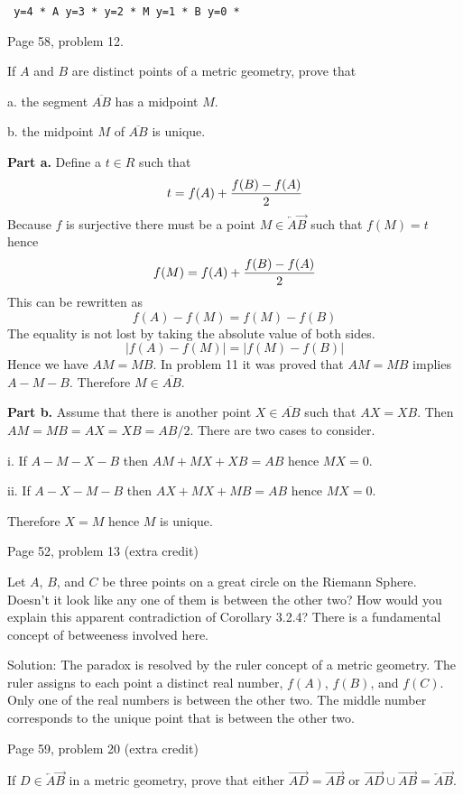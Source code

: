 {\obeylines\tt
y=4 * A
y=3 *
y=2 * M
y=1 * B
y=0 *
}

\beginsection Page 58, problem 12.

If $A$ and $B$ are distinct points of a metric geometry, prove that
\item{a.} the segment $\overline{AB}$ has a midpoint $M$.
\item{b.} the midpoint $M$ of $\overline{AB}$ is unique.

\medskip\noindent
{\bf Part a.}
Define a $t\in R$ such that
$$t=f(A)+{f(B)-f(A)\over 2}$$
Because $f$ is surjective there must be a point $M\in\overleftarrow A\overrightarrow B$
such that $f(M)=t$ hence
$$f(M)=f(A)+{f(B)-f(A)\over 2}$$
This can be rewritten as
$$f(A)-f(M)=f(M)-f(B)$$
The equality is not lost by taking the absolute value of both sides.
$$|f(A)-f(M)|=|f(M)-f(B)|$$
Hence we have $AM=MB$.
In problem 11 it was proved that $AM=MB$ implies $A{-}M{-}B$.
Therefore $M\in\overline{AB}$.

\medskip\noindent
{\bf Part b.}
Assume that there is another point $X\in\overline{AB}$ such that $AX=XB$.
Then $AM=MB=AX=XB=AB/2$.
There are two cases to consider.
\item{i.} If $A{-}M{-}X{-}B$ then $AM+MX+XB=AB$ hence $MX=0$.
\item{ii.} If $A{-}X{-}M{-}B$ then $AX+MX+MB=AB$ hence $MX=0$.
\par\noindent
Therefore $X=M$ hence $M$ is unique.

\beginsection Page 52, problem 13 (extra credit)

Let $A$, $B$, and $C$ be three points on a great circle on the Riemann Sphere.
Doesn't it look like any one of them is between the other two?
How would you explain this apparent contradiction of Corollary 3.2.4?
There is a fundamental concept of betweeness involved here.

\medskip\noindent
Solution: The paradox is resolved by the ruler concept of a metric geometry.
The ruler assigns to each point a distinct real number, $f(A)$, $f(B)$, and $f(C)$.
Only one of the real numbers is between the other two.
The middle number corresponds to the unique point that is between the other two.

\beginsection Page 59, problem 20 (extra credit)

If $D\in\overleftarrow A\overrightarrow B$ in a metric geometry,
prove that either $\overrightarrow{AD}=\overrightarrow{AB}$ or
$\overrightarrow{AD}\cup \overrightarrow{AB}=\overleftarrow A\overrightarrow B$.

